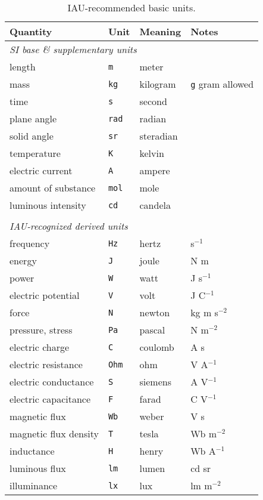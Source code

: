 \documentclass[onecolumn]{aa}
\begin{document}
\begin{table}
\centering
\caption{IAU-recommended basic units.}
\label{ta:IAUunit}
\begin{tabular}{llll}
\hline \hline
Quantity & Unit  & Meaning & Notes \\
\hline
%
\multicolumn{4}{l}{\it SI base \& supplementary units} \\ 
length                & \verb+m+   & meter   & \\
mass                  & \verb+kg+  & kilogram & \verb+g+ gram allowed\\
time                  & \verb+s+   & second  & \\
plane angle           & \verb+rad+ & radian  & \\
solid angle           & \verb+sr+  & steradian & \\
temperature           & \verb+K+   & kelvin  & \\
electric current      & \verb+A+   & ampere  & \\
amount of substance   & \verb+mol+ & mole    & \\
luminous intensity    & \verb+cd+  & candela & \\
& & & \\
\multicolumn{4}{l}{\it IAU-recognized derived units} \\
frequency             & \verb+Hz+  & hertz   & s$^{-1}$ \\
energy                & \verb+J+   & joule   & N m \\
power                 & \verb+W+   & watt    & J s$^{-1}$ \\
electric potential    & \verb+V+   & volt    & J C$^{-1}$ \\
force                 & \verb+N+   & newton  & kg m s$^{-2}$ \\
pressure, stress      & \verb+Pa+  & pascal  & N m$^{-2}$ \\
electric charge       & \verb+C+   & coulomb & A s \\
electric resistance   & \verb+Ohm+ & ohm     & V A$^{-1}$\\
electric conductance  & \verb+S+   & siemens & A V$^{-1}$ \\
electric capacitance  & \verb+F+   & farad   & C V$^{-1}$ \\
magnetic flux         & \verb+Wb+  & weber   & V s \\
magnetic flux density & \verb+T+   & tesla   & Wb m$^{-2}$ \\
inductance            & \verb+H+   & henry   & Wb A$^{-1}$ \\
luminous flux         & \verb+lm+  & lumen   & cd sr \\
illuminance           & \verb+lx+  & lux     & lm m$^{-2}$ \\
\hline
\end{tabular}
\end{table}
\end{document}
